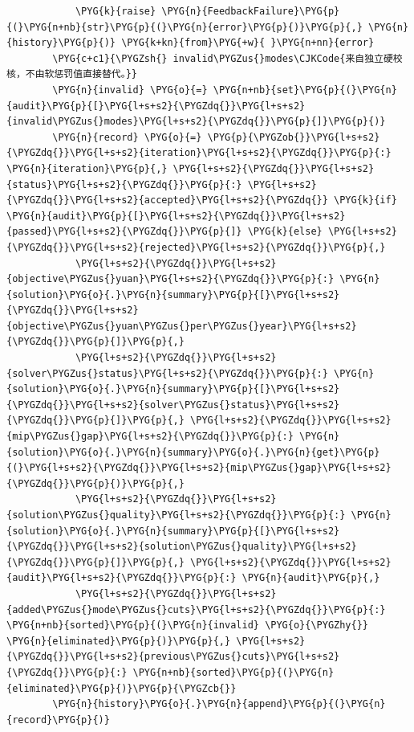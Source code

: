 \begin{Verbatim}
            \PYG{k}{raise} \PYG{n}{FeedbackFailure}\PYG{p}{(}\PYG{n+nb}{str}\PYG{p}{(}\PYG{n}{error}\PYG{p}{)}\PYG{p}{,} \PYG{n}{history}\PYG{p}{)} \PYG{k+kn}{from}\PYG{+w}{ }\PYG{n+nn}{error}
        \PYG{c+c1}{\PYGZsh{} invalid\PYGZus{}modes\CJKCode{来自独立硬校核，不由软惩罚值直接替代。}}
        \PYG{n}{invalid} \PYG{o}{=} \PYG{n+nb}{set}\PYG{p}{(}\PYG{n}{audit}\PYG{p}{[}\PYG{l+s+s2}{\PYGZdq{}}\PYG{l+s+s2}{invalid\PYGZus{}modes}\PYG{l+s+s2}{\PYGZdq{}}\PYG{p}{]}\PYG{p}{)}
        \PYG{n}{record} \PYG{o}{=} \PYG{p}{\PYGZob{}}\PYG{l+s+s2}{\PYGZdq{}}\PYG{l+s+s2}{iteration}\PYG{l+s+s2}{\PYGZdq{}}\PYG{p}{:} \PYG{n}{iteration}\PYG{p}{,} \PYG{l+s+s2}{\PYGZdq{}}\PYG{l+s+s2}{status}\PYG{l+s+s2}{\PYGZdq{}}\PYG{p}{:} \PYG{l+s+s2}{\PYGZdq{}}\PYG{l+s+s2}{accepted}\PYG{l+s+s2}{\PYGZdq{}} \PYG{k}{if} \PYG{n}{audit}\PYG{p}{[}\PYG{l+s+s2}{\PYGZdq{}}\PYG{l+s+s2}{passed}\PYG{l+s+s2}{\PYGZdq{}}\PYG{p}{]} \PYG{k}{else} \PYG{l+s+s2}{\PYGZdq{}}\PYG{l+s+s2}{rejected}\PYG{l+s+s2}{\PYGZdq{}}\PYG{p}{,}
            \PYG{l+s+s2}{\PYGZdq{}}\PYG{l+s+s2}{objective\PYGZus{}yuan}\PYG{l+s+s2}{\PYGZdq{}}\PYG{p}{:} \PYG{n}{solution}\PYG{o}{.}\PYG{n}{summary}\PYG{p}{[}\PYG{l+s+s2}{\PYGZdq{}}\PYG{l+s+s2}{objective\PYGZus{}yuan\PYGZus{}per\PYGZus{}year}\PYG{l+s+s2}{\PYGZdq{}}\PYG{p}{]}\PYG{p}{,}
            \PYG{l+s+s2}{\PYGZdq{}}\PYG{l+s+s2}{solver\PYGZus{}status}\PYG{l+s+s2}{\PYGZdq{}}\PYG{p}{:} \PYG{n}{solution}\PYG{o}{.}\PYG{n}{summary}\PYG{p}{[}\PYG{l+s+s2}{\PYGZdq{}}\PYG{l+s+s2}{solver\PYGZus{}status}\PYG{l+s+s2}{\PYGZdq{}}\PYG{p}{]}\PYG{p}{,} \PYG{l+s+s2}{\PYGZdq{}}\PYG{l+s+s2}{mip\PYGZus{}gap}\PYG{l+s+s2}{\PYGZdq{}}\PYG{p}{:} \PYG{n}{solution}\PYG{o}{.}\PYG{n}{summary}\PYG{o}{.}\PYG{n}{get}\PYG{p}{(}\PYG{l+s+s2}{\PYGZdq{}}\PYG{l+s+s2}{mip\PYGZus{}gap}\PYG{l+s+s2}{\PYGZdq{}}\PYG{p}{)}\PYG{p}{,}
            \PYG{l+s+s2}{\PYGZdq{}}\PYG{l+s+s2}{solution\PYGZus{}quality}\PYG{l+s+s2}{\PYGZdq{}}\PYG{p}{:} \PYG{n}{solution}\PYG{o}{.}\PYG{n}{summary}\PYG{p}{[}\PYG{l+s+s2}{\PYGZdq{}}\PYG{l+s+s2}{solution\PYGZus{}quality}\PYG{l+s+s2}{\PYGZdq{}}\PYG{p}{]}\PYG{p}{,} \PYG{l+s+s2}{\PYGZdq{}}\PYG{l+s+s2}{audit}\PYG{l+s+s2}{\PYGZdq{}}\PYG{p}{:} \PYG{n}{audit}\PYG{p}{,}
            \PYG{l+s+s2}{\PYGZdq{}}\PYG{l+s+s2}{added\PYGZus{}mode\PYGZus{}cuts}\PYG{l+s+s2}{\PYGZdq{}}\PYG{p}{:} \PYG{n+nb}{sorted}\PYG{p}{(}\PYG{n}{invalid} \PYG{o}{\PYGZhy{}} \PYG{n}{eliminated}\PYG{p}{)}\PYG{p}{,} \PYG{l+s+s2}{\PYGZdq{}}\PYG{l+s+s2}{previous\PYGZus{}cuts}\PYG{l+s+s2}{\PYGZdq{}}\PYG{p}{:} \PYG{n+nb}{sorted}\PYG{p}{(}\PYG{n}{eliminated}\PYG{p}{)}\PYG{p}{\PYGZcb{}}
        \PYG{n}{history}\PYG{o}{.}\PYG{n}{append}\PYG{p}{(}\PYG{n}{record}\PYG{p}{)}

\end{Verbatim}
